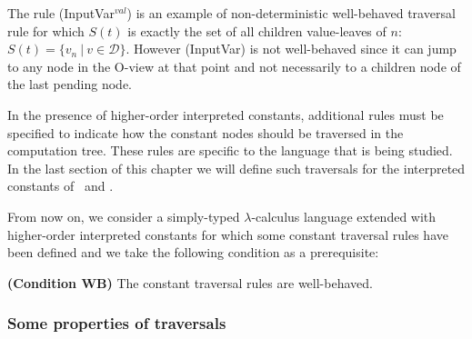 \begin{exmp} The rule (InputVar$^{val}$) is an example of non-deterministic well-behaved traversal rule for which $S(t)$ is exactly the set of all children value-leaves of $n$:
$S(t) = \{ v_n \ | \ v \in \mathcal{D} \} $.
However (InputVar) is not well-behaved since it can jump to any node in the O-view at that point and not necessarily to a children node of the last pending node.
\end{exmp}

In the presence of higher-order interpreted constants, additional rules must be specified to indicate how
the constant nodes should be traversed in the computation tree. These rules
are specific to the language that is being studied.
In the last section of this chapter we will define such traversals for the interpreted constants of
\pcf\ and \ialgol.

From now on, we consider a simply-typed $\lambda$-calculus language extended with
higher-order interpreted constants for which some constant traversal rules have been defined
and we take the following condition as a prerequisite:
\begin{center}
  \textbf{(Condition WB)} The constant traversal rules are well-behaved.
\end{center}


\subsubsection{Some properties of traversals}

